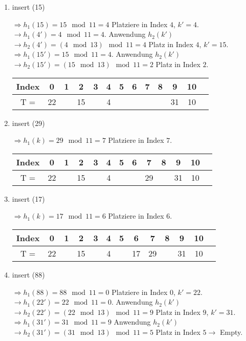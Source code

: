 \begin{enumerate}
\item insert (15)

$\Rightarrow h_1(15) = 15 \mod 11 = 4$ Platziere in Index $4$, $k'=4$.\\
$\rightarrow h_1(4') = 4 \mod 11 = 4$. Anwendung $h_2(k')$\\ 
$\rightarrow h_2(4') = (4 \mod 13) \mod 11 = 4$ Platz in Index $4$, $k' = 15$.\\
$\Rightarrow h_1(15') = 15 \mod 11 = 4$. Anwendung $h_2(k')$\\ 
$\rightarrow h_2(15') = (15 \mod 13) \mod 11 = 2$ Platz in Index $2$.\\
\begin{center}
\begin{tabular}{|c|c|c|c|c|c|c|c|c|c|c|c|c|}
\hline
Index & 0 & 1 & 2 & 3 & 4 & 5 & 6 & 7 & 8 & 9 & 10\\
\hline
T = & 22 &  & 15 &  & 4 &  &  &  &  & 31 & 10\\
\hline
\end{tabular}
\end{center}

\item insert (29)

$\Rightarrow h_1(k) = 29 \mod 11 = 7$ Platziere in Index $7$.
\begin{center}
\begin{tabular}{|c|c|c|c|c|c|c|c|c|c|c|c|c|}
\hline
Index & 0 & 1 & 2 & 3 & 4 & 5 & 6 & 7 & 8 & 9 & 10\\
\hline
T = & 22 &  & 15 &  & 4 &  &  & 29 &  & 31 & 10\\
\hline
\end{tabular}
\end{center}

\item insert (17)

$\Rightarrow h_1(k) = 17 \mod 11 = 6$ Platziere in Index $6$.
\begin{center}
\begin{tabular}{|c|c|c|c|c|c|c|c|c|c|c|c|c|}
\hline
Index & 0 & 1 & 2 & 3 & 4 & 5 & 6 & 7 & 8 & 9 & 10\\
\hline
T = & 22 &  & 15 &  & 4 &  & 17 & 29 &  & 31 & 10\\
\hline
\end{tabular}
\end{center}

\item insert (88)

$\Rightarrow h_1(88) = 88 \mod 11 = 0$ Platziere in Index $0$, $k' = 22$.\\
$\rightarrow h_1(22') = 22 \mod 11 = 0$. Anwendung $h_2(k')$\\ 
$\rightarrow h_2(22') = (22 \mod 13) \mod 11 = 9$ Platz in Index $9$, $k' = 31$.\\
$\Rightarrow h_1(31') = 31 \mod 11 = 9$ Anwendung $h_2(k')$\\
$\rightarrow h_2(31') = (31 \mod 13) \mod 11 = 5$ Platz in Index $5 \rightarrow$ Empty.\\



\end{enumerate}
